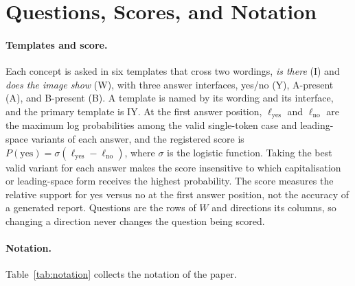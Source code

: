 \documentclass{article}
\begin{document}
\FloatBarrier

\section{Questions, Scores, and Notation}
\label{app:protocol}

\paragraph{Templates and score.} Each concept is asked in six templates that cross two wordings, \emph{is there} (I) and \emph{does the image show} (W), with three answer interfaces, yes/no (Y), A-present (A), and B-present (B). A template is named by its wording and its interface, and the primary template is IY. At the first answer position, $\ell_{\mathrm{yes}}$ and $\ell_{\mathrm{no}}$ are the maximum log probabilities among the valid single-token case and leading-space variants of each answer, and the registered score is $P(\mathrm{yes})=\sigma(\ell_{\mathrm{yes}}-\ell_{\mathrm{no}})$, where $\sigma$ is the logistic function. Taking the best valid variant for each answer makes the score insensitive to which capitalisation or leading-space form receives the highest probability. The score measures the relative support for yes versus no at the first answer position, not the accuracy of a generated report. Questions are the rows of $W$ and directions its columns, so changing a direction never changes the question being scored.

\paragraph{Notation.} Table~\ref{tab:notation} collects the notation of the paper.
\end{document}
